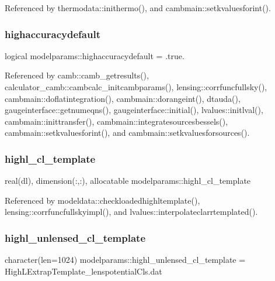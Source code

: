 Referenced by thermodata\+::inithermo(), and cambmain\+::setkvaluesforint().

\mbox{\label{namespacemodelparams_a248f1c00694dc15ba911d43021a79d6c}} 
\subsubsection{\texorpdfstring{highaccuracydefault}{highaccuracydefault}}
{\footnotesize\ttfamily logical modelparams\+::highaccuracydefault = .true.}



Referenced by camb\+::camb\+\_\+getresults(), calculator\+\_\+camb\+::cambcalc\+\_\+initcambparams(), lensing\+::corrfuncfullsky(), cambmain\+::doflatintegration(), cambmain\+::dorangeint(), dtauda(), gaugeinterface\+::getnumeqns(), gaugeinterface\+::initial(), lvalues\+::initlval(), cambmain\+::inittransfer(), cambmain\+::integratesourcesbessels(), cambmain\+::setkvaluesforint(), and cambmain\+::setkvaluesforsources().

\mbox{\label{namespacemodelparams_ac21d168dd37c9a2ef9fef53a5ba08c3c}} 
\subsubsection{\texorpdfstring{highl\+\_\+cl\+\_\+template}{highl\_cl\_template}}
{\footnotesize\ttfamily real(dl), dimension(\+:,\+:), allocatable modelparams\+::highl\+\_\+cl\+\_\+template}



Referenced by modeldata\+::checkloadedhighltemplate(), lensing\+::corrfuncfullskyimpl(), and lvalues\+::interpolateclarrtemplated().

\mbox{\label{namespacemodelparams_af0393446db4ef6a4d9b6ea1e107447dd}} 
\subsubsection{\texorpdfstring{highl\+\_\+unlensed\+\_\+cl\+\_\+template}{highl\_unlensed\_cl\_template}}
{\footnotesize\ttfamily character(len=1024) modelparams\+::highl\+\_\+unlensed\+\_\+cl\+\_\+template = \textquotesingle{}High\+L\+Extrap\+Template\+\_\+lenspotential\+Cls.\+dat\textquotesingle{}}



